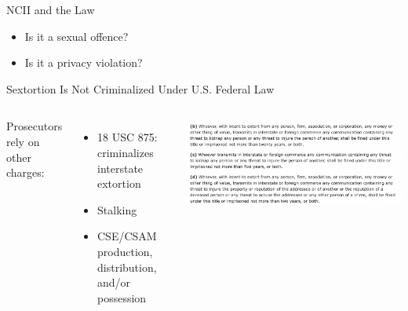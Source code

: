 \documentclass[nobackground,dvipsnames,table,aspectratio=169]{beamer}
\begin{document}
\begin{frame}{NCII and the Law}
    \large
    \begin{itemize}
        \item Is it a sexual offence?
        \item Is it a privacy violation?
    \end{itemize}
\end{frame}

\begin{frame}{Sextortion Is Not Criminalized Under U.S. Federal Law}
    \begin{columns}
            Prosecutors rely on other charges:
            \begin{itemize}
                \item 18 USC 875: criminalizes interstate extortion
                \item Stalking
                \item CSE/CSAM production, distribution, and/or possession
            \end{itemize}
            \includegraphics[width=\textwidth]{federal-law}
    \end{columns}
\end{frame}
\end{document}
